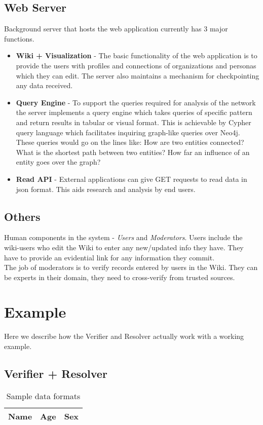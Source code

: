 \subsection{\textbf{Web Server}}
Background server that hosts the web application currently has 3 major functions.
\begin{itemize}
\item\textbf{Wiki + Visualization} - The basic functionality of the web application is to provide the users with profiles and connections of organizations and personas which they can edit. The server also maintains a mechanism for checkpointing any data received.
\item\textbf{Query Engine} - To support the queries required for analysis of the network the server implements a query engine which takes queries of specific pattern and return results in tabular or visual format. This is achievable by Cypher query language which facilitates inquiring graph-like queries over Neo4j. These queries would go on the lines like: How are two entities connected? What is the shortest path between two entities? How far an influence of an entity goes over the graph? 
\item\textbf{Read API} - External applications can give GET requests to read data in json format. This aids research and analysis by end users.	
\end{itemize}
\subsection{\textbf{Others}}
Human components in the system - \emph {Users} and \emph{Moderators}. Users include the wiki-users who edit the Wiki to enter any new/updated info they have. They have to provide an evidential link for any information they commit.\\
The job of moderators is to verify records entered by users in the Wiki. They can be experts in their domain, they need to cross-verify from trusted sources.

\section{Example}
Here we describe how the Verifier and Resolver actually work with a working example.
\subsection{\textbf{Verifier + Resolver}}	
\begin{table}
\centering
\begin{tabular}{| c | c | c |}
\hline
{\bf Name} & {\bf Age } & {\bf Sex }\\
\hline
\end{tabular}
\caption{Sample data formats}
\label{table:1}
\end{table}


